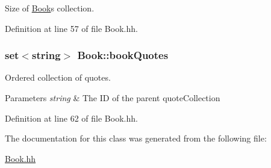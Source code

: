 Size of \hyperlink{class_book}{Book}\textquotesingle{}s collection. 



Definition at line 57 of file Book.\+hh.

\subsubsection[{\texorpdfstring{book\+Quotes}{bookQuotes}}]{\setlength{\rightskip}{0pt plus 5cm}set$<$string$>$ Book\+::book\+Quotes\hspace{0.3cm}{\ttfamily [private]}}\hypertarget{class_book_a370478eab144c20de936e1b68923e1c0}{}\label{class_book_a370478eab144c20de936e1b68923e1c0}


Ordered collection of quotes. 


\begin{DoxyParams}{Parameters}
{\em string} & The ID of the parent quote\+Collection \\
\hline
\end{DoxyParams}


Definition at line 62 of file Book.\+hh.



The documentation for this class was generated from the following file\+:\begin{DoxyCompactItemize}
\item 
\hyperlink{_book_8hh}{Book.\+hh}\end{DoxyCompactItemize}
